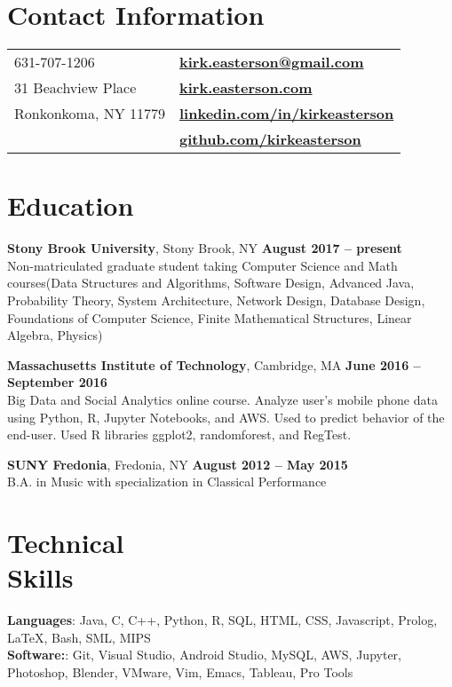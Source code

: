 \documentclass[margin,line]{res}
\begin{document}

\begin{resume}
\section{\sc Contact Information}

\vspace{.05in}
\begin{tabular}{@{}p{3.5in}p{3in}}
631-707-1206 & {\bf \href{mailto:kirk.easterson@gmail.com}{kirk.easterson@gmail.com}} \\
31 Beachview Place &  {\bf \href{http://www.kirkeasterson.com}{kirk.easterson.com}}\\
Ronkonkoma, NY 11779 &  {\bf \href{http://www.linkedin.com/in/kirkeasterson}{linkedin.com/in/kirkeasterson}}\\
& {\bf \href{https://www.github.com/kirkeasterson}{github.com/kirkeasterson}}
\end{tabular}

\section{\sc Education}
{\bf Stony Brook University}, Stony Brook, NY \hfill {\bf August 2017 -- present}\\
Non-matriculated graduate student taking Computer Science and Math courses(Data Structures and Algorithms, Software Design, Advanced Java, Probability Theory, System Architecture, Network Design, Database Design, Foundations of Computer Science, Finite Mathematical Structures, Linear Algebra, Physics)

{\bf Massachusetts Institute of Technology}, Cambridge, MA \hfill {\bf June 2016 -- September 2016}\\
Big Data and Social Analytics online course. Analyze user's mobile phone data using Python, R, Jupyter Notebooks, and AWS. Used to predict behavior of the end-user. Used R libraries ggplot2, randomforest, and RegTest.

{\bf SUNY Fredonia}, Fredonia, NY \hfill {\bf August 2012 -- May 2015}\\
B.A. in Music with specialization in Classical Performance

\section{\sc Technical\\Skills}
{\bf Languages}:  Java, C, C++, Python, R, SQL, HTML, CSS, Javascript, Prolog, {\LaTeX}, Bash, SML, MIPS\\
{\bf Software:}: Git, Visual Studio, Android Studio, MySQL, AWS, Jupyter, Photoshop, Blender, VMware, Vim, Emacs, Tableau, Pro Tools


\end{resume}
\end{document}

